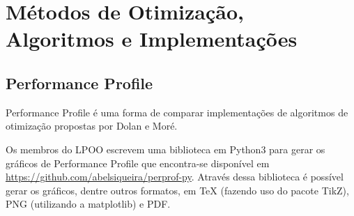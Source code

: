 \chapter{Métodos de Otimização, Algoritmos e Implementações}

\section{Performance Profile}
Performance Profile é uma forma de comparar implementações de algoritmos de
otimização propostas por Dolan e Moré.

Os membros do LPOO escrevem uma biblioteca em Python3 para gerar os gráficos de
Performance Profile que encontra-se disponível em
\url{https://github.com/abelsiqueira/perprof-py}. Através dessa biblioteca é
possível gerar os gráficos, dentre outros formatos, em TeX (fazendo uso do pacote
TikZ), PNG (utilizando a matplotlib) e PDF.

